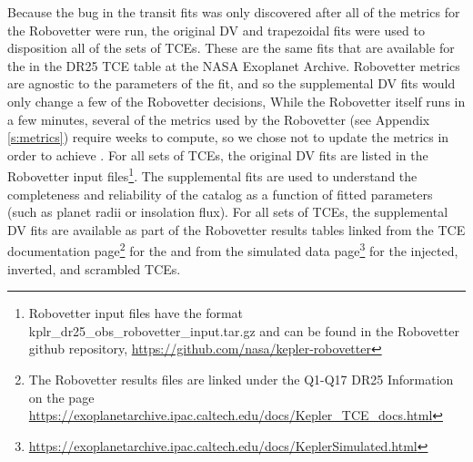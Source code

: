 Because the bug in the transit fits was only discovered after all of the metrics for the Robovetter were run, the original DV and trapezoidal fits were used to disposition all of the sets of TCEs. These are the same fits that are available for the  in the DR25 TCE table at the NASA Exoplanet Archive.  Robovetter metrics are agnostic to the parameters of the fit, and so the supplemental DV fits would only change a few of the Robovetter decisions,  While the Robovetter itself runs in a few minutes, several of the metrics used by the Robovetter (see Appendix \ref{s:metrics}) require weeks to compute, so we chose not to update the metrics in order to achieve . For all sets of TCEs, the original DV fits are listed in the Robovetter input files\footnote{Robovetter input files have the format kplr\_dr25\_obs\_robovetter\_input.tar.gz and can be found in the Robovetter github repository, \url{https://github.com/nasa/kepler-robovetter}}. The supplemental fits are used to understand the completeness and reliability of the catalog as a function of fitted parameters (such as planet radii or insolation flux). For all sets of TCEs, the supplemental DV fits are available as part of the Robovetter results tables linked from the TCE documentation page\footnote{The Robovetter results files are linked under the Q1-Q17 DR25 Information on the page \url{https://exoplanetarchive.ipac.caltech.edu/docs/Kepler\_TCE\_docs.html}} for the  and from the simulated data page\footnote{\url{https://exoplanetarchive.ipac.caltech.edu/docs/KeplerSimulated.html}} \citep[see][]{Christiansen2017,Coughlin2017a} for the injected, inverted, and scrambled TCEs.


